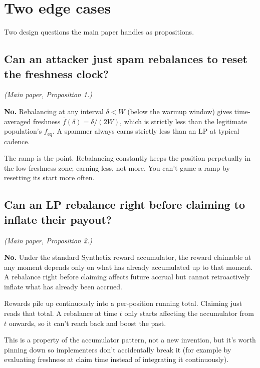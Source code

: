 \documentclass[11pt,a4paper]{article}
\begin{document}
\section{Two edge cases}

Two design questions the main paper handles as propositions.

\subsection{Can an attacker just spam rebalances to reset the freshness clock?}

\emph{(Main paper, Proposition 1.)}

\begin{result}
\textbf{No.} Rebalancing at any interval $\delta < W$ (below the warmup window) gives time-averaged freshness $\bar f(\delta) = \delta/(2W)$, which is strictly less than the legitimate population's $f_{\text{eq}}$. A spammer always earns strictly less than an LP at typical cadence.
\end{result}

\begin{intuition}
The ramp is the point. Rebalancing constantly keeps the position perpetually in the low-freshness zone; earning less, not more. You can't game a ramp by resetting its start more often.
\end{intuition}

\subsection{Can an LP rebalance right before claiming to inflate their payout?}

\emph{(Main paper, Proposition 2.)}

\begin{result}
\textbf{No.} Under the standard Synthetix reward accumulator, the reward claimable at any moment depends only on what has already accumulated up to that moment. A rebalance right before claiming affects future accrual but cannot retroactively inflate what has already been accrued.
\end{result}

\begin{intuition}
Rewards pile up continuously into a per-position running total. Claiming just reads that total. A rebalance at time $t$ only starts affecting the accumulator from $t$ onwards, so it can't reach back and boost the past.

This is a property of the accumulator pattern, not a new invention, but it's worth pinning down so implementers don't accidentally break it (for example by evaluating freshness at claim time instead of integrating it continuously).
\end{intuition}
\end{document}
